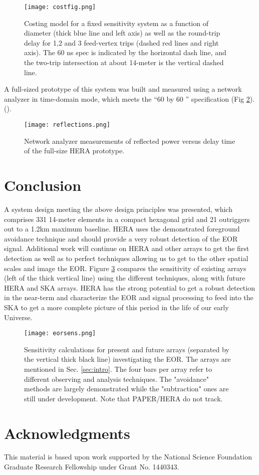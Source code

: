 \documentclass{article}
\begin{document}
\begin{figure}[t]
\centerline{
\texttt{[image: costfig.png]} 
}
\caption{\small Costing model for a fixed sensitivity system as a function of diameter (thick blue line and left axis) as well as the round-trip delay for 1,2 and 3 feed-vertex trips (dashed red lines and right axis).  The 60 ns spec is indicated by the horizontal dash line, and the two-trip intersection at about 14-meter is the vertical dashed line.
\label{fig:costfig}}
\end{figure}

A full-sized prototype of this system was built and measured using a network analyzer in time-domain mode, which meets the ``60 by 60 '' specification (Fig \ref{fig:refl}). (\cite{heraMemo5}).

\begin{figure}[t]
\centerline{
\texttt{[image: reflections.png]} 
}
\caption{\small Network analyzer measurements of reflected power versus delay time of the full-size HERA prototype.
\label{fig:refl}}
\end{figure}

\section{Conclusion}
A system design meeting the above design principles was presented, which comprises 331 14-meter elements in a compact hexagonal grid and 21 outriggers out to a 1.2km maximum baseline.  HERA uses the demonstrated foreground avoidance technique and should provide a very robust detection of the EOR signal.  Additional work will continue on HERA and other arrays to get the first detection as well as to perfect techniques allowing us to get to the other spatial scales and image the EOR.  Figure \ref{fig:eorsense} compares the sensitivity of existing arrays (left of the thick vertical line) using the different techniques, along with future HERA and SKA arrays.  HERA has the strong potential to get a robust detection in the near-term and characterize the EOR and signal processing to feed into the SKA to get a more complete picture of this period in the life of our early Universe.

\begin{figure}[t]
\centerline{
\texttt{[image: eorsens.png]} 
}
\caption{\small Sensitivity calculations for present and future arrays  (separated by the vertical thick black line) investigating the EOR.
The arrays are mentioned in Sec. \ref{sec:intro}.  The four bars per array refer to different observing and analysis techniques.  The "avoidance" 
methods are largely demonstrated while the "subtraction" ones are still under development.  Note that PAPER/HERA do not track.
\label{fig:eorsense}}
\end{figure}
\section*{Acknowledgments}
This material is based upon work supported by the National Science Foundation Graduate Research Fellowship under Grant No. 1440343.


\end{document}

